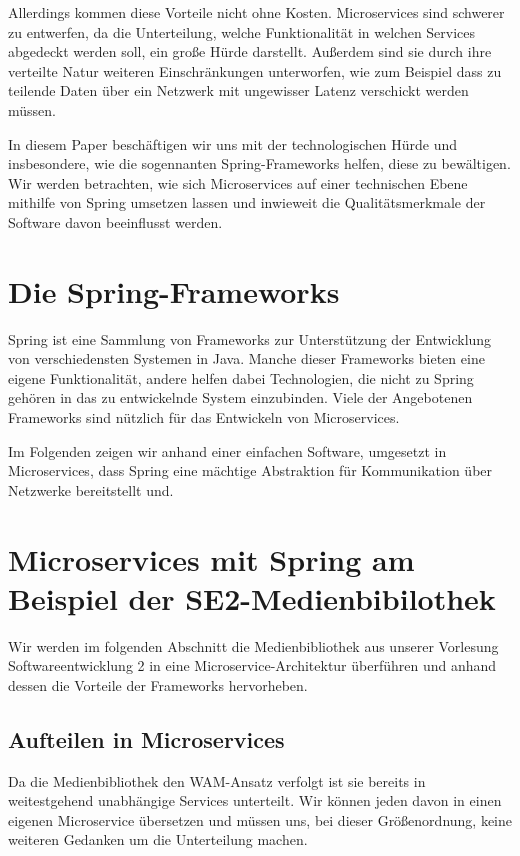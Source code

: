 \documentclass{article}
\begin{document}
Allerdings kommen diese Vorteile nicht ohne Kosten.
Microservices sind schwerer zu entwerfen, da die Unterteilung, welche Funktionalität in welchen Services abgedeckt werden soll, ein große Hürde darstellt. \cite{SCASASD}
Außerdem sind sie durch ihre verteilte Natur weiteren Einschränkungen unterworfen, wie zum Beispiel dass zu teilende Daten über ein Netzwerk mit ungewisser Latenz verschickt werden müssen. \cite{MATT}

In diesem Paper beschäftigen wir uns mit der technologischen Hürde und insbesondere, wie die sogennanten Spring-Frameworks helfen, diese zu bewältigen.
Wir werden betrachten, wie sich Microservices auf einer technischen Ebene mithilfe von Spring umsetzen lassen und inwieweit die Qualitätsmerkmale der Software davon beeinflusst werden.

\section{Die Spring-Frameworks}

Spring ist eine Sammlung von Frameworks zur Unterstützung der Entwicklung von verschiedensten Systemen in Java.
Manche dieser Frameworks bieten eine eigene Funktionalität, andere helfen dabei Technologien, die nicht zu Spring gehören in das zu entwickelnde System einzubinden.
Viele der Angebotenen Frameworks sind nützlich für das Entwickeln von Microservices.

Im Folgenden zeigen wir anhand einer einfachen Software, umgesetzt in Microservices, dass Spring eine mächtige Abstraktion für Kommunikation über Netzwerke bereitstellt und.

\section{Microservices mit Spring am Beispiel der SE2-Medienbibilothek}

Wir werden im folgenden Abschnitt die Medienbibliothek aus unserer Vorlesung Softwareentwicklung 2 in eine Microservice-Architektur überführen und anhand dessen die Vorteile der Frameworks hervorheben.

\subsection{Aufteilen in Microservices}

Da die Medienbibliothek den WAM-Ansatz verfolgt ist sie bereits in weitestgehend unabhängige Services unterteilt.
Wir können jeden davon in einen eigenen Microservice übersetzen und müssen uns, bei dieser Größenordnung, keine weiteren Gedanken um die Unterteilung machen.
\end{document}
